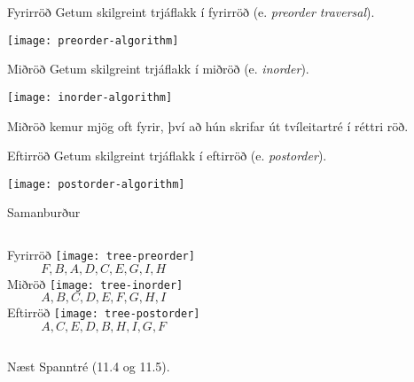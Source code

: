 \documentclass[handout]{beamer}
\begin{document}
\begin{frame}[fragile]{Fyrirröð}
    Getum skilgreint trjáflakk í fyrirröð (e. \emph{preorder traversal}).

    \begin{center}
        \texttt{[image: preorder-algorithm]}
    \end{center}
\end{frame}

\begin{frame}[fragile]{Miðröð}
    Getum skilgreint trjáflakk í miðröð (e. \emph{inorder}).

    \begin{center}
        \texttt{[image: inorder-algorithm]}
    \end{center}

Miðröð kemur mjög oft fyrir, því að hún skrifar út tvíleitartré í réttri röð.
\end{frame}

\begin{frame}[fragile]{Eftirröð}
Getum skilgreint trjáflakk í eftirröð (e. \emph{postorder}).

\begin{center}
    \texttt{[image: postorder-algorithm]}
\end{center}
\end{frame}

\begin{frame}{Samanburður}
\begin{columns}
Fyrirröð
\texttt{[image: tree-preorder]}
\[F, B, A, D, C, E, G, I, H\]
Miðröð
\texttt{[image: tree-inorder]}
\[A, B, C, D, E, F, G, H, I\]
Eftirröð
\texttt{[image: tree-postorder]}
\[A, C, E, D, B, H, I, G, F\]
\end{columns}

\end{frame}



\begin{frame}{Næst}
Spanntré (11.4 og 11.5).
\end{frame}
\end{document}
